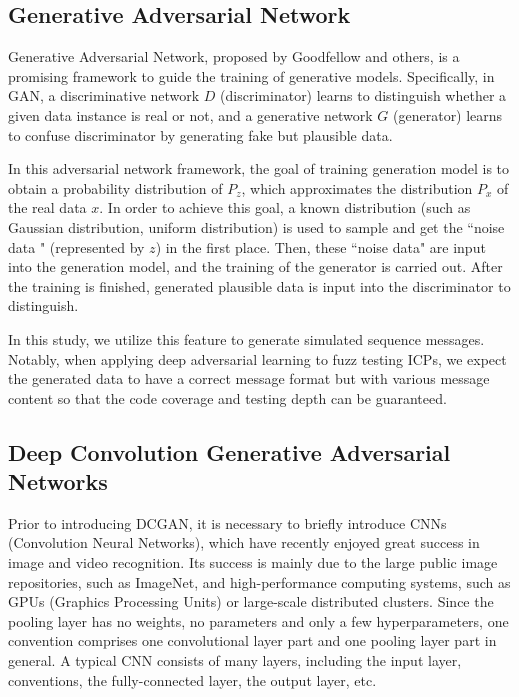 \subsection{Generative Adversarial Network}
Generative Adversarial Network, proposed by Goodfellow and others, is a promising framework to guide the training of generative models. Specifically, in GAN, a discriminative network $D$ (discriminator) learns to distinguish whether a given data instance is real or not, and a generative network $G$ (generator) learns to confuse discriminator by generating fake but plausible data. 

In this adversarial network framework, the goal of training generation model is to obtain a probability distribution of $P_z$, which approximates the distribution $P_x$ of the real data $x$. In order to achieve this goal, a known distribution (such as Gaussian distribution, uniform distribution) is used to sample and get the ``noise data " (represented by $z$) in the first place. Then, these ``noise data" are input into the generation model, and the training of the generator is carried out. After the training is finished, generated plausible data is input into the discriminator to distinguish. 

In this study, we utilize this feature to generate simulated sequence messages. Notably, when applying deep adversarial learning to fuzz testing ICPs, we expect the generated data to have a correct message format but with various message content so that the code coverage and testing depth can be guaranteed. 


\subsection{Deep Convolution Generative Adversarial Networks}
Prior to introducing DCGAN, it is necessary to briefly introduce CNNs (Convolution Neural Networks), which have recently enjoyed great success in image and video recognition. Its success is mainly due to the large public image repositories, such as ImageNet, and high-performance computing systems, such as GPUs (Graphics Processing Units) or large-scale distributed clusters. Since the pooling layer has no weights, no parameters and only a few hyperparameters, one convention comprises one convolutional layer part and one pooling layer part in general. A typical CNN consists of many layers, including the input layer, conventions, the fully-connected layer, the output layer, etc.


